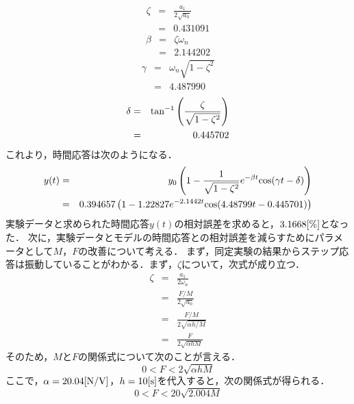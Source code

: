\documentclass[12pt]{jsarticle}
\begin{document}
\begin{eqnarray}
  \label{StepResponse_calculate_zeta}
  \zeta &=& \frac{a_1}{2\sqrt{a_0}} \\
        &=& 0.431091 \nonumber
\end{eqnarray}
\begin{eqnarray}
  \label{StepResponse_calculate_beta}
  \beta &=& \zeta \omega_n \\
        &=& 2.144202 \nonumber
\end{eqnarray}
\begin{eqnarray}
  \label{StepResponse_calculate_gamma}
  \gamma &=& \omega_n\sqrt{1-\zeta^2} \\
         &=& 4.487990 \nonumber
\end{eqnarray}
\begin{eqnarray}
  \label{StepResponse_calculate_delta}
  \delta &=& {\rm tan}^{-1}\left(\frac{\zeta}{\sqrt{1-\zeta^2}}\right) \\
         &=& 0.445702 \nonumber
\end{eqnarray}
これより，時間応答は次のようになる．
\begin{eqnarray}
  \label{Response_y_t}
  y(t) &=& y_0\left(1 - \frac{1}{\sqrt{1-\zeta^2}}e^{-\beta t}{\rm cos}(\gamma t - \delta)\right) \\
       &=& 0.394657\left(1 - 1.22827e^{-2.1442 t}{\rm cos}(4.48799 t - 0.445701)\right) \nonumber
\end{eqnarray}
実験データと求められた時間応答$y(t)$の相対誤差を求めると，$3.1668{\rm [\%]}$となった．
次に，実験データとモデルの時間応答との相対誤差を減らすためにパラメータとして$M$，$F$の改善について考える．
まず，同定実験の結果からステップ応答は振動していることがわかる．まず，$\zeta$について，次式が成り立つ．
\begin{eqnarray}
  \label{MF_zeta}
  \zeta &=& \frac{a_1}{2\omega_n} \\
        &=& \frac{F/M}{2\sqrt{a_0}} \\
        &=& \frac{F/M}{2\sqrt{\alpha h / M}} \\
        &=& \frac{F}{2\sqrt{\alpha h M}}
\end{eqnarray}
そのため，$M$と$F$の関係式について次のことが言える．
\begin{equation}
  \label{MF_F_greater}
  0 < F < 2\sqrt{\alpha h M}
\end{equation}
ここで，$\alpha = 20.04{\rm [N/V]}$，$h = 10{\rm [s]}$を代入すると，次の関係式が得られる．
\begin{equation}
  \label{MF_F_greater_changed}
  0 < F < 20\sqrt{2.004 M}
\end{equation}
\end{document}
